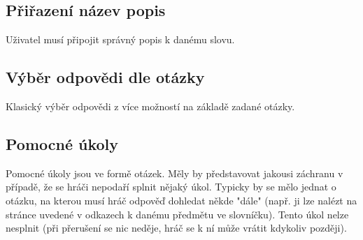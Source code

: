 \documentclass[a4paper,12pt]{article}
\begin{document}
\subsection{Přiřazení název popis}
Uživatel musí připojit správný popis k danému slovu.
\begin{figure}[H]
\end{figure}
\subsection{Výběr odpovědi dle otázky}
Klasický výběr odpovědi z více možností na základě zadané otázky.
\begin{figure}[H]
\end{figure}
\subsection{Pomocné úkoly}
Pomocné úkoly jsou ve formě otázek. Měly by představovat jakousi záchranu v případě, že se hráči nepodaří splnit nějaký úkol. Typicky by se mělo  jednat o otázku, na kterou musí hráč odpověď dohledat někde "dále" (např. ji lze nalézt na stránce uvedené v odkazech k danému předmětu ve slovníčku). Tento úkol nelze nesplnit (při přerušení se nic neděje, hráč se k ní může vrátit kdykoliv později).
\newpage
\end{document}
